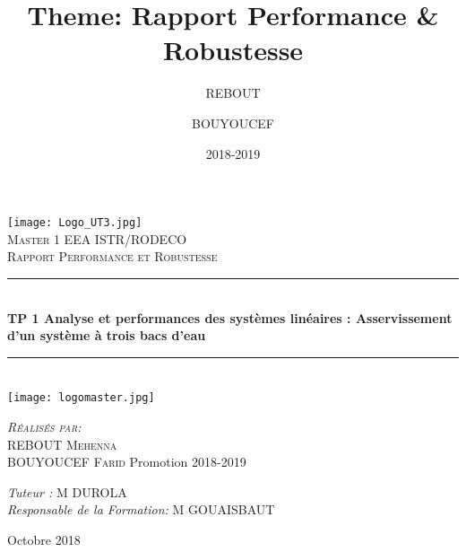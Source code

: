 \documentclass[12pt, a4paper, openany]{report}
\title{Theme: Rapport Performance & Robustesse}
\author{REBOUT \bsc{Mehenna}}
\author{BOUYOUCEF \bsc{Farid}}
\date{2018-2019}
\newcommand{\HRule}{\rule{\linewidth}{0.5mm}}
\begin{document}

\makeatletter
  \begin{titlepage}
  

  \begin{sffamily}
   \begin{center}

    \texttt{[image: Logo\_UT3.jpg]}~\\[1.5cm]

    \textsc{\LARGE Master 1 EEA ISTR/RODECO  }\\[2cm]

    \textsc{\Large Rapport Performance et Robustesse}\\[1.5cm]

    \HRule \\[0.4cm] %
    { \huge \bfseries TP 1 Analyse et performances des systèmes linéaires : Asservissement d'un système à trois bacs d'eau\\[0.4cm] }

    \HRule \\[1cm]   %
    \texttt{[image: logomaster.jpg]}
    \\[1cm]

    \begin{minipage}{0.4\textwidth}
      \begin{flushleft} \large
         \textsc{\emph {Réalisés par:} \\REBOUT Mehenna}\\
         \textsc{BOUYOUCEF Farid}   
          \newline
          Promotion 2018-2019 \\
      \end{flushleft}
    \end{minipage}
    \begin{minipage}{0.4\textwidth}
      \begin{flushright} \large
        \emph{Tuteur :}  \textsc{M DUROLA}\\
        \emph{Responsable de la Formation:} \textsc{M GOUAISBAUT}
      \end{flushright}
    \end{minipage}

    \vfill

    {\large Octobre 2018}

  \end{center}
  \end{sffamily}      
          
  \end{titlepage}
  
\end{document}
